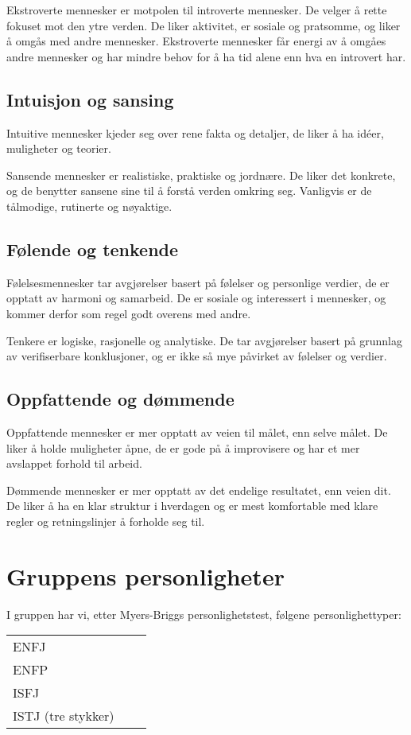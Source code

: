 Ekstroverte mennesker er motpolen til introverte mennesker. De velger å rette fokuset mot den ytre verden. De liker aktivitet, er sosiale og pratsomme, og liker å omgås med andre mennesker. Ekstroverte mennesker får energi av å omgåes andre mennesker og har mindre behov for å ha tid alene enn hva en introvert har.

\subsection{Intuisjon og sansing}

Intuitive mennesker kjeder seg over rene fakta og detaljer, de liker å ha idéer, muligheter og teorier. 

Sansende mennesker er realistiske, praktiske og jordnære. De liker det konkrete, og de benytter sansene sine til å forstå verden omkring seg. Vanligvis er de tålmodige, rutinerte og nøyaktige.

\subsection{Følende og tenkende}

Følelsesmennesker tar avgjørelser basert på følelser og personlige verdier, de er opptatt av harmoni og samarbeid. De er sosiale og interessert i mennesker, og kommer derfor som regel godt overens med andre.

Tenkere er logiske, rasjonelle og analytiske. De tar avgjørelser basert på grunnlag av verifiserbare konklusjoner, og er ikke så mye påvirket av følelser og verdier.

\subsection{Oppfattende og dømmende}

Oppfattende mennesker er mer opptatt av veien til målet, enn selve målet. De liker å holde muligheter åpne, de er gode på å improvisere og har et mer avslappet forhold til arbeid.

Dømmende mennesker er mer opptatt av det endelige resultatet, enn veien dit. De liker å ha en klar struktur i hverdagen og er mest komfortable med klare regler og retningslinjer å forholde seg til.

\section{Gruppens personligheter}

I gruppen har vi, etter Myers-Briggs personlighetstest, følgene personlighettyper:
\begin{center}
\begin{tabular}{l c r}
ENFJ\\
ENFP\\
ISFJ\\
ISTJ (tre stykker)\\
\end{tabular}
\end{center}


